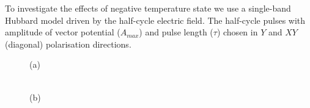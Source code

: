To investigate the effects of negative temperature state we use a single-band Hubbard model driven by the half-cycle electric field. The half-cycle pulses with amplitude of vector potential ($A_{max}$) and pulse length ($\tau$) chosen in $Y$ and $XY$ (diagonal) polarisation directions.
\begin{figure}[h!]
\begin{minipage}[h]{0.5\linewidth}
 (a) \\
\end{minipage}
\hfill
\begin{minipage}[h]{0.5\linewidth}
 \\(b)

\end{minipage}
\end{figure}
